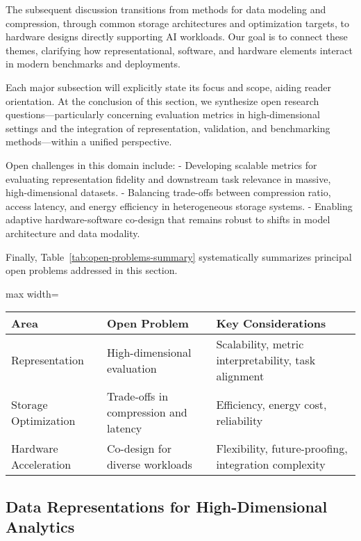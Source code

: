 \documentclass[sigconf]{acmart}
\begin{document}
The subsequent discussion transitions from methods for data modeling and compression, through common storage architectures and optimization targets, to hardware designs directly supporting AI workloads. Our goal is to connect these themes, clarifying how representational, software, and hardware elements interact in modern benchmarks and deployments.

Each major subsection will explicitly state its focus and scope, aiding reader orientation. At the conclusion of this section, we synthesize open research questions—particularly concerning evaluation metrics in high-dimensional settings and the integration of representation, validation, and benchmarking methods—within a unified perspective.

Open challenges in this domain include:
- Developing scalable metrics for evaluating representation fidelity and downstream task relevance in massive, high-dimensional datasets.
- Balancing trade-offs between compression ratio, access latency, and energy efficiency in heterogeneous storage systems.
- Enabling adaptive hardware-software co-design that remains robust to shifts in model architecture and data modality.

Finally, Table~\ref{tab:open-problems-summary} systematically summarizes principal open problems addressed in this section.

\begin{table*}[htbp]
\centering
\caption{Summary of principal open research challenges in data representation, storage optimization, and hardware acceleration.}
\label{tab:open-problems-summary}
\begin{adjustbox}{max width=\textwidth}
\begin{tabular}{@{}lll@{}}
\toprule
\textbf{Area} & \textbf{Open Problem} & \textbf{Key Considerations} \\
\midrule
Representation & High-dimensional evaluation & Scalability, metric interpretability, task alignment \\
Storage Optimization & Trade-offs in compression and latency & Efficiency, energy cost, reliability \\
Hardware Acceleration & Co-design for diverse workloads & Flexibility, future-proofing, integration complexity \\
\bottomrule
\end{tabular}
\end{adjustbox}
\end{table*}

\subsection{Data Representations for High-Dimensional Analytics}
\end{document}
